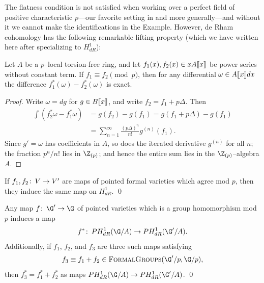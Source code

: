 
The flatness condition is not satisfied when working over a perfect field of positive characteristic \(p\)---our favorite setting in  and  more generally---and without it we cannot make the identifications in the Example.
However, de Rham cohomology has the following remarkable lifting property (which we have written here after specializing to \(H^1_{dR}\)):

\begin{theorem}
Let \(A\) be a \(p\)--local torsion-free ring, and let \(f_1(x), f_2(x) \in x A\llbracket{x}\rrbracket\) be power series without constant term.
If \(f_1 \equiv f_2 \pmod{p}\), then for any differential \(\omega \in A\llbracket{x}\rrbracket dx\) the difference \(f_1^*(\omega) - f_2^*(\omega)\) is exact.
\end{theorem}
\begin{proof}
Write \(\omega = dg\) for \(g \in B\llbracket{x}\rrbracket\), and write \(f_2 = f_1 + p\Delta\).
Then
\begin{align*}
\int \left( f_2^* \omega - f_1^* \omega \right) & = g(f_2) - g(f_1) = g(f_1 + p\Delta) - g(f_1) \\
& = \sum_{n = 1}^\infty \frac{(p\Delta)^n}{n!} g^{(n)}(f_1).
\end{align*}
Since \(g' = \omega\) has coefficients in \(A\), so does the iterated derivative \(g^{(n)}\) for all \(n\); the fraction \(p^n/n!\) lies in \(\Z_{(p)}\); and hence the entire sum lies in the \(\Z_{(p)}\)--algebra \(A\).
\end{proof}

\begin{corollary}\label{H1dRIsCrystalline}
If \(f_1, f_2\colon\thinspace V \to V'\) are maps of pointed formal varieties which agree mod \(p\), then they induce the same map on \(H^1_{dR}\). \qed
\end{corollary}

\begin{corollary}
Any map \(f\co \G' \to \G\) of pointed varieties which is a group homomorphism mod \(p\) induces a map \[f^*\co PH^1_{dR}(\G/A) \to PH^1_{dR}(\G'/A).\]
Additionally, if \(f_1\), \(f_2\), and \(f_3\) are three such maps satisfying \[f_3 \equiv f_1 + f_2 \in \CatOf{FormalGroups}(\G'/p, \G/p),\] then \(f_3^* = f_1^* + f_2^*\) as maps \(PH^1_{dR}(\G/A) \to PH^1_{dR}(\G'/A)\). \qed
\end{corollary}

